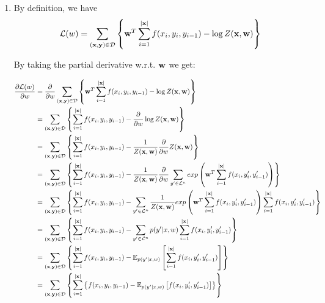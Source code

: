 \documentclass{article}
\begin{document}
\begin{enumerate}
\item
By definition, we have
\begin{equation*}
\mathcal{L}(w) = \sum_{({\bf x},{\bf y})\in\mathcal{D}} \left\{ {\bf w}^T \sum_{i=1}^{|{\bf x}|}f(x_i,y_i,y_{i-1}) - \log Z({\bf x}, {\bf w}) \right\}
\end{equation*}

By taking the partial derivative w.r.t. ${\bf w}$ we get:

\begin{equation*}
\begin{split}
\frac{\partial\mathcal{L}(w)}{\partial w} &= \frac{\partial}{\partial w}\sum_{({\bf x},{\bf y})\in\mathcal{D}} \left\{ {\bf w}^T \sum_{i=1}^{|{\bf x}|}f(x_i,y_i,y_{i-1}) - \log Z({\bf x}, {\bf w}) \right\}\\
&= \sum_{({\bf x},{\bf y})\in\mathcal{D}} \left\{ \sum_{i=1}^{|{\bf x}|}f(x_i,y_i,y_{i-1}) - \frac{\partial}{\partial w} \log Z({\bf x}, {\bf w}) \right\}\\
&= \sum_{({\bf x},{\bf y})\in\mathcal{D}} \left\{ \sum_{i=1}^{|{\bf x}|}f(x_i,y_i,y_{i-1}) - \frac{1}{Z({\bf x}, {\bf w})}\frac{\partial}{\partial w} Z({\bf x}, {\bf w}) \right\}\\
&= \sum_{({\bf x},{\bf y})\in\mathcal{D}} \left\{ \sum_{i=1}^{|{\bf x}|}f(x_i,y_i,y_{i-1}) - \frac{1}{Z({\bf x}, {\bf w})}\frac{\partial}{\partial w} \sum_{y'\in\mathcal{L}^n}exp\left({\bf w}^T \sum_{i=1}^{|{\bf x}|}f(x_i,y'_i,y'_{i-1})\right) \right\}\\
&= \sum_{({\bf x},{\bf y})\in\mathcal{D}} \left\{ \sum_{i=1}^{|{\bf x}|}f(x_i,y_i,y_{i-1}) - \sum_{y'\in\mathcal{L}^n}\frac{1}{Z({\bf x}, {\bf w})} exp\left({\bf w}^T \sum_{i=1}^{|{\bf x}|}f(x_i,y'_i,y'_{i-1})\right)\sum_{i=1}^{|{\bf x}|}f(x_i,y'_i,y'_{i-1}) \right\}\\
&= \sum_{({\bf x},{\bf y})\in\mathcal{D}} \left\{ \sum_{i=1}^{|{\bf x}|}f(x_i,y_i,y_{i-1}) - \sum_{y'\in\mathcal{L}^n}p(y'|x,w) \sum_{i=1}^{|{\bf x}|}f(x_i,y'_i,y'_{i-1}) \right\}\\
&= \sum_{({\bf x},{\bf y})\in\mathcal{D}} \left\{ \sum_{i=1}^{|{\bf x}|}f(x_i,y_i,y_{i-1}) - \mathbb{E}_{p(y'|x,w)}\left[ \sum_{i=1}^{|{\bf x}|}f(x_i,y'_i,y'_{i-1})\right] \right\}\\
&= \sum_{({\bf x},{\bf y})\in\mathcal{D}} \left\{ \sum_{i=1}^{|{\bf x}|} \left\{f(x_i,y_i,y_{i-1}) - \mathbb{E}_{p(y'|x,w)}\left[f(x_i,y'_i,y'_{i-1})\right] \right\}\right\}
\end{split}
\end{equation*}


\end{enumerate}
\end{document}
